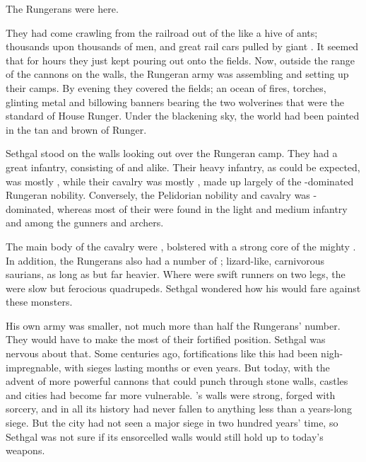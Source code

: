 
\begin{comment}
  \section{The Rungerans come into view}
\end{comment}

The Rungerans were here. 

They had come crawling from the railroad out of the \wylde like a hive of ants; thousands upon thousands of men, and great rail cars pulled by giant \saurians. 
It seemed that for hours they just kept pouring out onto the fields.
Now, outside the range of the cannons on the walls, the Rungeran army was assembling and setting up their camps.
By evening they covered the fields; an ocean of fires, torches, glinting metal and billowing banners bearing the two wolverines that were the standard of House Runger.
Under the blackening sky, the world had been painted in the tan and brown \colours of Runger. 

Sethgal stood on the walls looking out over the Rungeran camp. 
They had a great infantry, consisting of \scathae and \humans alike. 
Their heavy infantry, as could be expected, was mostly \scathaese, while their cavalry was mostly \human, made up largely of the \human-dominated Rungeran nobility. 
Conversely, the Pelidorian nobility and cavalry was \scatha-dominated, whereas most of their \humans were found in the light and medium infantry and among the gunners and archers. 

The main body of the cavalry were \relcers, bolstered with a strong core of the mighty \murocs. 
In addition, the Rungerans also had a number of \mezolisks; lizard-like, carnivorous saurians, as long as \relcs but far heavier. 
Where \relcs were swift runners on two legs, the \mezolisks were slow but ferocious quadrupeds. 
Sethgal wondered how his \grulcans would fare against these monsters. 

His own army was smaller, not much more than half the Rungerans' number. 
They would have to make the most of their fortified position. 
Sethgal was nervous about that. 
Some centuries ago, fortifications like this had been nigh-impregnable, with sieges lasting months or even years. 
But today, with the advent of more powerful cannons that could punch through stone walls, castles and cities had become far more vulnerable. 
\Forclin's walls were strong, forged with \Ortaican sorcery, and in all its history \Forclin had never fallen to anything less than a years-long siege. 
But the city had not seen a major siege in two hundred years' time, so Sethgal was not sure if its ensorcelled walls would still hold up to today's weapons. 

